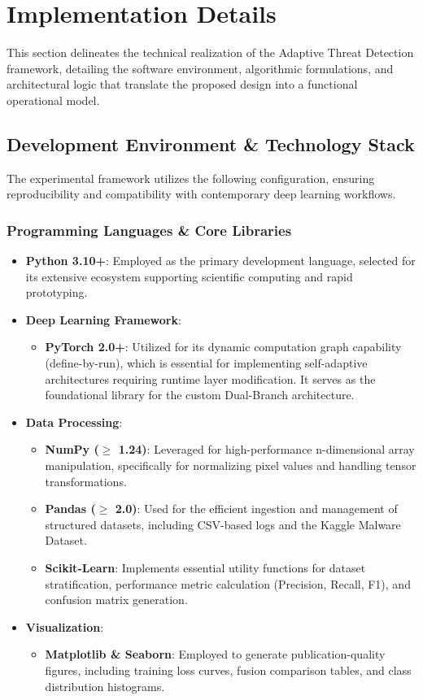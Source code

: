 \section{Implementation Details}
\label{sec:implementation_details}

This section delineates the technical realization of the Adaptive Threat Detection framework, detailing the software environment, algorithmic formulations, and architectural logic that translate the proposed design into a functional operational model.

\subsection{Development Environment \& Technology Stack}
The experimental framework utilizes the following configuration, ensuring reproducibility and compatibility with contemporary deep learning workflows.

\subsubsection{Programming Languages \& Core Libraries}
\begin{itemize}
    \item \textbf{Python 3.10+}: Employed as the primary development language, selected for its extensive ecosystem supporting scientific computing and rapid prototyping.
    \item \textbf{Deep Learning Framework}:
    \begin{itemize}
        \item \textbf{PyTorch 2.0+}: Utilized for its dynamic computation graph capability (define-by-run), which is essential for implementing self-adaptive architectures requiring runtime layer modification. It serves as the foundational library for the custom Dual-Branch architecture.
    \end{itemize}
    \item \textbf{Data Processing}:
    \begin{itemize}
        \item \textbf{NumPy ($\geq$ 1.24)}: Leveraged for high-performance n-dimensional array manipulation, specifically for normalizing pixel values and handling tensor transformations.
        \item \textbf{Pandas ($\geq$ 2.0)}: Used for the efficient ingestion and management of structured datasets, including CSV-based logs and the Kaggle Malware Dataset.
        \item \textbf{Scikit-Learn}: Implements essential utility functions for dataset stratification, performance metric calculation (Precision, Recall, F1), and confusion matrix generation.
    \end{itemize}
    \item \textbf{Visualization}:
    \begin{itemize}
        \item \textbf{Matplotlib \& Seaborn}: Employed to generate publication-quality figures, including training loss curves, fusion comparison tables, and class distribution histograms.
    \end{itemize}
\end{itemize}

